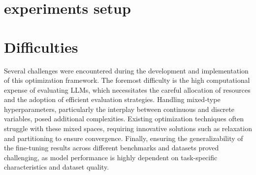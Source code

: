 \section{experiments setup}
\label{sec:exp_setup}


\section{Difficulties}
Several challenges were encountered during the development and implementation of this optimization framework. The foremost difficulty is the high computational expense of evaluating LLMs, which necessitates the careful allocation of resources and the adoption of efficient evaluation strategies. Handling mixed-type hyperparameters, particularly the interplay between continuous and discrete variables, posed additional complexities. Existing optimization techniques often struggle with these mixed spaces, requiring innovative solutions such as relaxation and partitioning to ensure convergence. Finally, ensuring the generalizability of the fine-tuning results across different benchmarks and datasets proved challenging, as model performance is highly dependent on task-specific characteristics and dataset quality.
